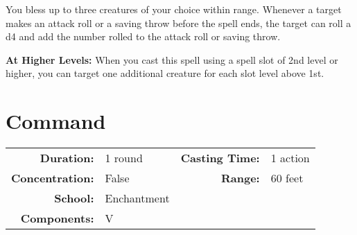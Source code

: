 \documentclass[a5paper, 12pt]{memoir}
\begin{document}
\vspace{1\baselineskip}\noindent You bless up to three creatures of your choice within range. Whenever a target makes an attack roll or a saving throw before the spell ends, the target can roll a d4 and add the number rolled to the attack roll or saving throw.

\vspace{8pt} \noindent\textbf{At Higher Levels:} When you cast this spell using a spell slot of 2nd level or higher, you can target one additional creature for each slot level above 1st.
\newpage
\section*{Command}

{
\small\centering\vspace{-6pt}
\begin{tabular}{rlrl}
\toprule

\textbf{Duration:} & 1 round &
\textbf{Casting Time:} & 1 action \\
\textbf{Concentration:} & False &
\textbf{Range:} & 60 feet \\
\textbf{School:} & Enchantment \\
\textbf{Components:} & \multicolumn{3}{p{0.7\textwidth}}{V}\\

\bottomrule
\end{tabular}
}
\end{document}

